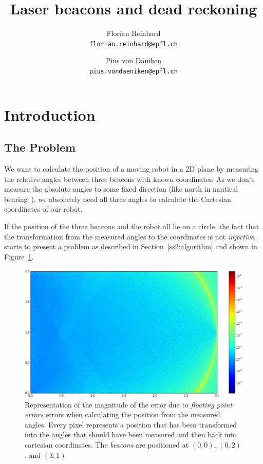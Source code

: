\documentclass[a4paper, 12pt]{paper}
\author{Florian Reinhard\\
        \texttt{florian.reinhard@epfl.ch} \and
        Pius von Däniken\\
        \texttt{pius.vondaeniken@epfl.ch}}
\title{Laser beacons and dead reckoning}
\begin{document}
\maketitle

\tableofcontents

\section{Introduction}

\subsection{The Problem}

We want to calculate the position of a moving robot in a 2D plane by measuring
the relative angles between three beacons with known coordinates.
As we don't measure the absolute angles to some fixed direction (like north in
nautical bearing~\cite{wikipedia_bearing}), we absolutely need all three
angles to calculate the Cartesian coordinates of our robot.

If the position of the three beacons and the robot all lie on a circle, the
fact that the transformation from the measured angles to the coordinates is not
\emph{injective}, starts to present a problem as described in
Section~\ref{ss2:algorithm} and shown in Figure~\ref{fig:error_map}.

\begin{figure}[H]
    \centering
    \includegraphics[width=\textwidth]{error_color_map_log}
    \caption{Representation of the magnitude of the error due to
        \emph{floating point errors} errors when calculating the position from
        the measured angles. Every pixel represents a position that has been
        transformed into the angles that should have been measured and then back
        into cartesian coordinates. The \emph{beacons} are positioned at
        $\left(0, 0\right)$, $\left(0, 2\right)$, and $\left(3, 1\right)$}
\label{fig:error_map}
\end{figure}
\end{document}
